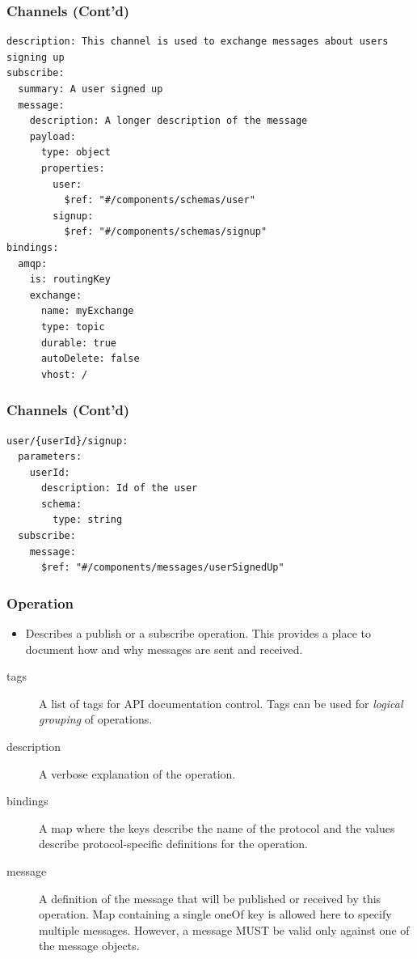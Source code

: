\documentclass{efd-lecture}
\begin{document}
\begin{frame}[fragile]
  \frametitle{Channels (Cont'd)}
  \scriptsize
  \begin{verbatim}
description: This channel is used to exchange messages about users signing up
subscribe:
  summary: A user signed up
  message:
    description: A longer description of the message
    payload:
      type: object
      properties:
        user:
          $ref: "#/components/schemas/user"
        signup:
          $ref: "#/components/schemas/signup"
bindings:
  amqp:
    is: routingKey
    exchange:
      name: myExchange
      type: topic
      durable: true
      autoDelete: false
      vhost: /
  \end{verbatim}
\end{frame}

\begin{frame}[fragile]
  \frametitle{Channels (Cont'd)}
  \scriptsize
  \begin{verbatim}
user/{userId}/signup:
  parameters:
    userId:
      description: Id of the user
      schema:
        type: string
  subscribe:
    message:
      $ref: "#/components/messages/userSignedUp"
  \end{verbatim}
\end{frame}

\begin{frame}[fragile]
  \frametitle{Operation}
  \begin{itemize}
    \item Describes a publish or a subscribe operation. This provides a place to document how and why messages are sent and received.
  \end{itemize}
  \begin{description}
    \item[tags] A list of tags for API documentation control. Tags can be used for \textit{\color{YellowOrange} logical grouping} of operations.
    \item[description] A verbose explanation of the operation.
    \item[bindings] A map where the keys describe the name of the protocol and the values describe protocol-specific definitions for the operation.
    \item[message] A definition of the message that will be published or received by this operation. Map containing a single oneOf key is allowed here to specify multiple messages.
      However, a message MUST be valid only against one of the message objects.
  \end{description}
\end{frame}
\end{document}
